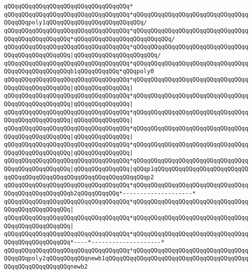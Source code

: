 \verb|qQQqqQQqqQQqqQQqqQQqqQQqqQQqqQQqqQQq*|\newline
\verb|qQQqqQQqqQQqqQQqqQQqqQQqqQQqqQQqqQQq*qQQqqQQqqQQqqQQqqQQqqQQqqQQqqQQqqQQqqQQqpoly1qQQqqQQqqQQqqQQqqQQqqQQqqQQq/|\newline
\verb|qQQqqQQqqQQqqQQqqQQqqQQqqQQqqQQqqQQq*qQQqqQQqqQQqqQQqqQQqqQQqqQQqqQQqqQQqqQQqqQQqqQQqqQQq*qQQqqQQqqQQqqQQqqQQqqQQqqQQq/|\newline
\verb|qQQqqQQqqQQqqQQqqQQqqQQqqQQqqQQqqQQq*qQQqqQQqqQQqqQQqqQQqqQQqqQQqqQQqqQQqqQQqqQQqqQQqqQQq|\verb#|qQQqqQQqqQQqqQQqqQQqqQQq/#\newline
\verb|qQQqqQQqqQQqqQQqqQQqqQQqqQQqqQQqqQQq*qQQqqQQqqQQqqQQqqQQqqQQqqQQqqQQqqQQqqQQqqQQqqQQqqQQqb1qQQqqQQqqQQq*qQQqpoly0|\newline
\verb|qQQqqQQqqQQqqQQqqQQqqQQqqQQqqQQqqQQq*qQQqqQQqqQQqqQQqqQQqqQQqqQQqqQQqqQQqqQQqqQQqqQQqqQQq|\verb#|qQQqqQQqqQQqqQQq|#\newline
\verb|qQQqqQQqqQQqqQQqqQQqqQQqqQQqqQQqqQQq*qQQqqQQqqQQqqQQqqQQqqQQqqQQqqQQqqQQqqQQqqQQqqQQqqQQq|\verb#|qQQqqQQqqQQqqQQq|#\newline
\verb|qQQqqQQqqQQqqQQqqQQqqQQqqQQqqQQqqQQq*qQQqqQQqqQQqqQQqqQQqqQQqqQQqqQQqqQQqqQQqqQQqqQQqqQQq|\verb#|qQQqqQQqqQQqqQQq|#\newline
\verb|qQQqqQQqqQQqqQQqqQQqqQQqqQQqqQQqqQQq*qQQqqQQqqQQqqQQqqQQqqQQqqQQqqQQqqQQqqQQqqQQqqQQqqQQq|\verb#|qQQqqQQqqQQqqQQq|#\newline
\verb|qQQqqQQqqQQqqQQqqQQqqQQqqQQqqQQqqQQq*qQQqqQQqqQQqqQQqqQQqqQQqqQQqqQQqqQQqqQQqqQQqqQQqqQQq|\verb#|qQQqqQQqqQQqqQQq|#\newline
\verb|qQQqqQQqqQQqqQQqqQQqqQQqqQQqqQQqqQQq*qQQqqQQqqQQqqQQqqQQqqQQqqQQqqQQqqQQqqQQqqQQqqQQqqQQq|\verb#|qQQqqQQqqQQqqQQq|qQQqp1qQQqqQQqqQQqqQQqqQQqqQQqqQQqqQQqqQQqqQQqqQQqqQQqqQQqqQQqqQQqqQQqqQQqp2#\newline
\verb|qQQqqQQqqQQqqQQqqQQqqQQqqQQqqQQqqQQq*qQQqqQQqqQQqqQQqqQQqqQQqqQQqqQQqqQQqqQQqqQQqqQQqqQQqb2qQQqqQQqqQQq*--------------------*|\newline
\verb|qQQqqQQqqQQqqQQqqQQqqQQqqQQqqQQqqQQq*qQQqqQQqqQQqqQQqqQQqqQQqqQQqqQQqqQQqqQQqqQQqqQQqqQQq|\verb#|#\newline
\verb|qQQqqQQqqQQqqQQqqQQqqQQqqQQqqQQqqQQq*qQQqqQQqqQQqqQQqqQQqqQQqqQQqqQQqqQQqqQQqqQQqqQQqqQQq|\verb#|#\newline
\verb|qQQqqQQqqQQqqQQqqQQqqQQqqQQqqQQqqQQq*qQQqqQQqqQQqqQQqqQQqqQQqqQQqqQQqqQQqqQQqqQQqqQQqqQQq*----*--------------------*|\newline
\verb|qQQqqQQqqQQqqQQqqQQqqQQqqQQqqQQqqQQq*qQQqqQQqqQQqqQQqqQQqqQQqqQQqqQQqqQQqqQQqpoly2qQQqqQQqqQQqnewb1qQQqqQQqqQQqqQQqqQQqqQQqqQQqqQQqqQQqqQQqqQQqqQQqqQQqqQQqqQQqnewb2|\newline

